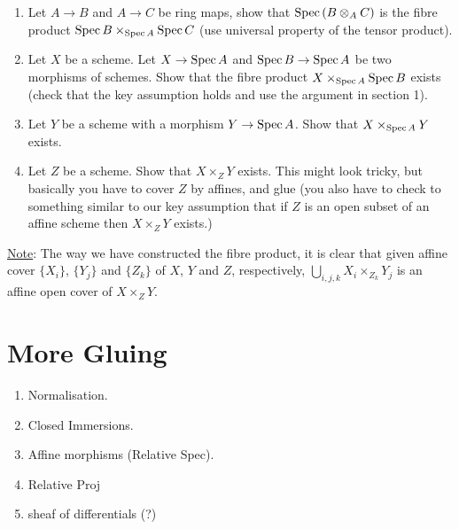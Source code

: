 \documentclass[10pt]{amsart}
\newcommand{\Spec}{{\rm Spec \,}}
\theoremstyle{definition}
\begin{document}
\begin{enumerate}\addtocounter{enumi}{-1}
	\item Let $A\rightarrow B$ and $A\rightarrow C$ be ring maps, show that $\Spec (B\otimes_A C)$ is the fibre product $\Spec B\times_{\Spec A} \Spec C$ (use universal property of the tensor product).
	\item  Let $X$ be a scheme. Let $X\rightarrow\Spec A$ and $\Spec B\rightarrow \Spec A$ be two morphisms of schemes. Show that the fibre product $X\times_{\Spec A}\Spec B$ exists (check that the key assumption holds and use the argument in section 1).
	\item Let $Y$ be a scheme with a morphism $Y\rightarrow \Spec A$. Show that $X\times_{\Spec A} Y$ exists.
	\item Let $Z$ be a scheme. Show that $X\times_Z Y$ exists. This might look tricky, but basically you have to cover $Z$ by affines, and glue (you also have to check to something similar to our key assumption that if $Z$ is an open subset of an affine scheme then $X\times_Z Y$ exists.)
	
\end{enumerate}

\underline{Note}: The way we have constructed the fibre product, it is clear that given affine cover $\lbrace X_i\rbrace$, $\lbrace Y_j\rbrace$ and $\lbrace Z_k\rbrace$ of $X$, $Y$ and $Z$, respectively,  $\bigcup_{i,j,k}X_i\times_{Z_k}Y_j$ is an affine open cover of $X\times_Z Y$.

\section{More Gluing}

\begin{enumerate}
	\item Normalisation.
	\item Closed Immersions.
	\item Affine morphisms (Relative Spec).
	\item Relative Proj
	\item sheaf of differentials (?)
\end{enumerate}
\end{document}
